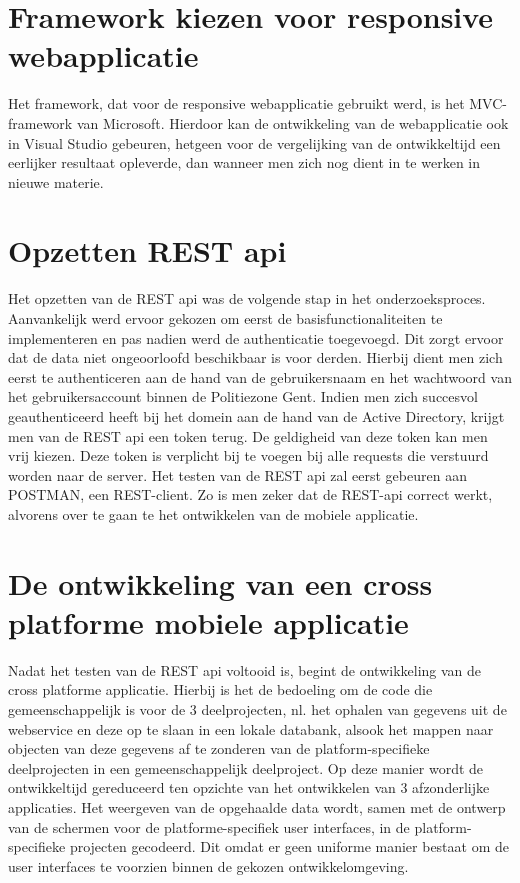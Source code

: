 \section{Framework kiezen voor responsive webapplicatie}
Het framework, dat voor de responsive webapplicatie gebruikt werd, is het MVC-framework van Microsoft.
Hierdoor kan de ontwikkeling van de webapplicatie ook in Visual Studio gebeuren, hetgeen voor de vergelijking van de ontwikkeltijd
een eerlijker resultaat opleverde, dan wanneer men zich nog dient in te werken in nieuwe materie.

\section{Opzetten REST api}
Het opzetten van de REST api was de volgende stap in het onderzoeksproces. Aanvankelijk werd ervoor gekozen om eerst de basisfunctionaliteiten te implementeren en
pas nadien werd de authenticatie toegevoegd. Dit zorgt ervoor dat de data niet ongeoorloofd beschikbaar is voor derden.
Hierbij dient men zich eerst te authenticeren aan de hand van de gebruikersnaam en het wachtwoord van het gebruikersaccount binnen de Politiezone Gent.
Indien men zich succesvol geauthenticeerd heeft bij het domein aan de hand van de Active Directory, krijgt men van de REST api een token terug. De geldigheid van deze token kan men vrij kiezen.
Deze token is verplicht bij te voegen bij alle requests die verstuurd worden naar de server.
Het testen van de REST api zal eerst gebeuren aan POSTMAN, een REST-client. Zo is men zeker dat de REST-api correct werkt, alvorens over te gaan te het ontwikkelen van de mobiele applicatie.

\section{De ontwikkeling van een cross platforme mobiele applicatie}
Nadat het testen van de REST api voltooid is, begint de ontwikkeling van de cross platforme applicatie.
Hierbij is het de bedoeling om de code die gemeenschappelijk is voor de 3 deelprojecten,
nl. het ophalen van gegevens uit de webservice en deze op te slaan in een lokale databank, alsook het mappen naar objecten van deze gegevens
 af te zonderen van de platform-specifieke deelprojecten in een gemeenschappelijk deelproject.
 Op deze manier wordt de ontwikkeltijd gereduceerd ten opzichte van het ontwikkelen van 3 afzonderlijke applicaties.
Het weergeven van de opgehaalde data wordt, samen met de ontwerp van de schermen voor de platforme-specifiek user interfaces,
in de platform-specifieke projecten gecodeerd. Dit omdat er geen uniforme manier bestaat om de user interfaces te voorzien binnen
de gekozen ontwikkelomgeving.

